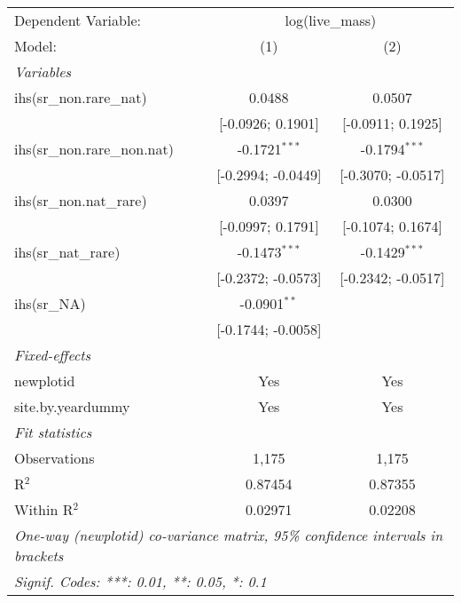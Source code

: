 \begin{tabular}{lcc}
\tabularnewline\midrule\midrule
Dependent Variable:&\multicolumn{2}{c}{log(live\_mass)}\\
Model:&(1) & (2)\\
\midrule \emph{Variables}&   &  \\
ihs(sr\_non.rare\_nat)&0.0488 & 0.0507\\
  &[-0.0926; 0.1901] & [-0.0911; 0.1925]\\
ihs(sr\_non.rare\_non.nat)&-0.1721$^{***}$ & -0.1794$^{***}$\\
  &[-0.2994; -0.0449] & [-0.3070; -0.0517]\\
ihs(sr\_non.nat\_rare)&0.0397 & 0.0300\\
  &[-0.0997; 0.1791] & [-0.1074; 0.1674]\\
ihs(sr\_nat\_rare)&-0.1473$^{***}$ & -0.1429$^{***}$\\
  &[-0.2372; -0.0573] & [-0.2342; -0.0517]\\
ihs(sr\_NA)&-0.0901$^{**}$ &   \\
  &[-0.1744; -0.0058] &   \\
\midrule \emph{Fixed-effects}&   &  \\
newplotid & Yes & Yes\\
site.by.yeardummy & Yes & Yes\\
\midrule \emph{Fit statistics}&  & \\
Observations & 1,175&1,175\\
R$^2$ & 0.87454&0.87355\\
Within R$^2$ & 0.02971&0.02208\\
\midrule\midrule\multicolumn{3}{l}{\emph{One-way (newplotid) co-variance matrix, 95\% confidence intervals in brackets}}\\
\multicolumn{3}{l}{\emph{Signif. Codes: ***: 0.01, **: 0.05, *: 0.1}}\\
\end{tabular}


